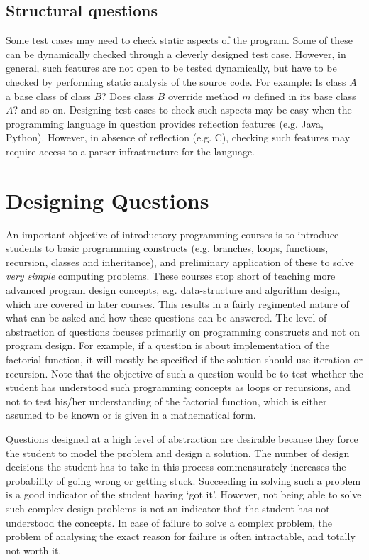 \documentclass{article}
\begin{document}
\subsection{Structural questions}
Some test cases may need to check static aspects of the program. Some of these can be dynamically checked through a cleverly designed test case. However, in general, such features are not open to be tested dynamically, but have to be checked by performing static analysis of the source code. For example: Is class $A$ a base class of class $B$? Does class $B$ override method $m$ defined in its base class $A$? and so on. Designing test cases to check such aspects may be easy when the programming language in question provides reflection features (e.g. Java, Python). However, in absence of reflection (e.g. C), checking such features may require access to a parser infrastructure for the language.

\section{Designing Questions}
An important objective of introductory programming courses is to introduce students to basic programming constructs (e.g. branches, loops, functions, recursion, classes and inheritance), and preliminary application of these to solve \emph{very simple} computing problems. These courses stop short of teaching more advanced program design concepts, e.g. data-structure and algorithm design, which are covered in later courses. This results in a fairly regimented nature of what can be asked and how these questions can be answered. The level of abstraction of questions focuses primarily on programming constructs and not on program design. For example, if a question is about implementation of the factorial function, it will mostly be specified if the solution should use iteration or recursion. Note that the objective of such a question would be to test whether the student has understood such programming concepts as loops or recursions, and not to test his/her understanding of the factorial function, which is either assumed to be known or is given in a mathematical form.

Questions designed at a high level of abstraction are desirable because they force the student to model the problem and design a solution. The number of design decisions the student has to take in this process commensurately increases the probability of going wrong or getting stuck. Succeeding in solving such a problem is a good indicator of the student having `got it'. However, not being able to solve such complex design problems is not an indicator that the student has not understood the concepts. In case of failure to solve a complex problem, the problem of analysing the exact reason for failure is often intractable, and totally not worth it.
\end{document}
